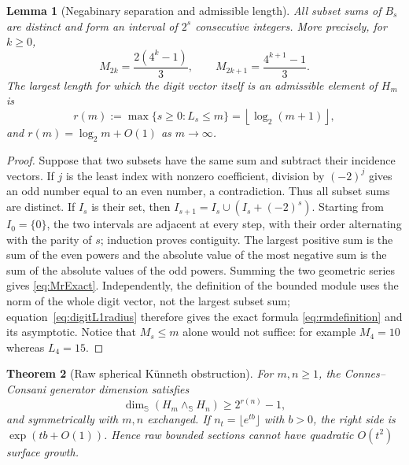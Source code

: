 \documentclass[11pt]{amsart}
\newtheorem{theorem}{Theorem}[section]
\newtheorem{lemma}[theorem]{Lemma}
\theoremstyle{definition}
\theoremstyle{remark}
\begin{document}
\begin{lemma}[Negabinary separation and admissible length]
\label{lem:negabinaryradius}
All subset sums of $B_s$ are distinct and form an interval of $2^s$
consecutive integers.  More precisely, for $k\geq0$,
\begin{equation}\label{eq:MrExact}
 M_{2k}=\frac{2(4^k-1)}3,
 \qquad
 M_{2k+1}=\frac{4^{k+1}-1}3.
\end{equation}
The largest length for which the digit vector itself is an admissible
element of $H_m$ is
\begin{equation}\label{eq:rmdefinition}
 r(m):=\max\{s\geq0:L_s\leq m\}
      =\left\lfloor\log_2(m+1)\right\rfloor,
\end{equation}
and $r(m)=\log_2m+O(1)$ as $m\to\infty$.
\end{lemma}

\begin{proof}
Suppose that two subsets have the same sum and subtract their incidence
vectors.  If $j$ is the least index with nonzero coefficient, division by
$(-2)^j$ gives an odd number equal to an even number, a contradiction.
Thus all subset sums are distinct.  If $I_s$ is their set, then
$I_{s+1}=I_s\cup(I_s+(-2)^s)$.  Starting from $I_0=\{0\}$, the two intervals
are adjacent at every step, with their order alternating with the parity of
$s$; induction proves contiguity.  The largest positive sum is the sum of
the even powers and the absolute value of the most negative sum is the sum
of the absolute values of the odd powers.  Summing the two geometric series
gives \eqref{eq:MrExact}.  Independently, the definition of the bounded
module uses the norm of the whole digit vector, not the largest subset
sum; equation~\eqref{eq:digitL1radius} therefore gives the exact formula
\eqref{eq:rmdefinition} and its asymptotic.  Notice that $M_s\leq m$ alone
would not suffice: for example $M_4=10$ whereas $L_4=15$.
\end{proof}

\begin{theorem}[Raw spherical K\"unneth obstruction]
\label{thm:rawsmashnogo}
For $m,n\geq1$, the Connes--Consani generator dimension satisfies
\begin{equation}\label{eq:rawSmashBound}
 \dim_{\mathbb S}(H_m\wedge_{\mathbb S}H_n)
 \geq 2^{r(n)}-1,
\end{equation}
and symmetrically with $m,n$ exchanged.  If
$n_t=\lfloor e^{tb}\rfloor$ with $b>0$, the right side is
$\exp(tb+O(1))$.  Hence raw bounded sections cannot have quadratic
$O(t^2)$ surface growth.
\end{theorem}
\end{document}
